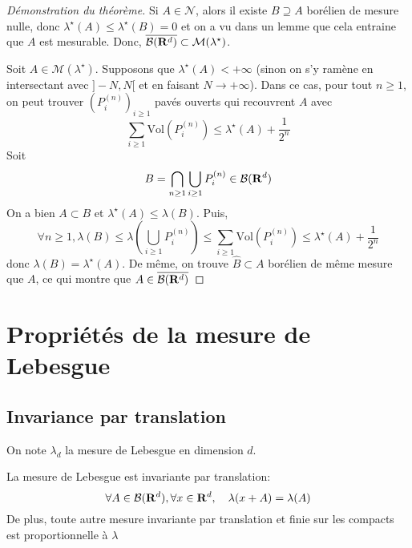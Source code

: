 \begin{proof}[Démonstration du théorème]
    Si $A \in  \mathcal N$, alors il existe $B\supseteq A$ borélien de mesure nulle, donc  $\lambda^\star(A)\leq \lambda^\star (B)=0$ et on a vu dans un lemme que cela entraine que $A$ est mesurable. Donc,  $\overline{\mathcal  B(\mathbf R^d)}\subset \mathcal  M(\lambda^\star)$.

    Soit $A \in  \mathcal  M(\lambda^\star)$. Supposons que $\lambda^\star(A)<+\infty$ (sinon on s'y ramène en intersectant avec $]-N,N[$ et en faisant  $N\to +\infty$). Dans ce cas, pour tout $n\geq 1$, on peut trouver $(P_i^{(n)})_{i\geq 1}$ pavés ouverts qui recouvrent  $A$ avec  \[
        \sum_{i\geq 1}\mathrm{Vol}(P_i^{(n)})\leq \lambda^\star(A)+ \frac1{2^n}
    \] 
    Soit  \[
        B=\bigcap_{n\geq 1}\bigcup _{i\geq 1}P_i^{(n)} \in  \mathcal  B(\mathbf R^d)
    \] 
    On a bien $A\subset B$ et  $\lambda^\star(A)\leq \lambda(B)$. Puis, \[
        \forall  n\geq 1, \lambda(B) \leq  \lambda \left( \bigcup_{i\geq 1} P_i^{(n)} \right)\leq \sum_{i\geq 1} \mathrm{Vol}(P_i^{(n)})\leq \lambda^\star(A)+\frac1{2^n}
    \] 
    donc $\lambda(B)=\lambda^\star(A)$. De même, on trouve  $\hat{B} \subset A$ borélien de même mesure que $A$, ce qui montre que  $A \in  \overline{\mathcal  B(\mathbf R^d)}$
\end{proof}

\section{Propriétés de la mesure de Lebesgue}

\subsection{Invariance par translation}

On note $\lambda_d$ la mesure de Lebesgue en dimension  $d$.

 \begin{thm}
La mesure de Lebesgue est invariante par translation: \[
    \forall  A \in  \mathcal  B(\mathbf R^d), \forall x \in  \mathbf R^d, \quad  \lambda(x+A)=\lambda(A)
\]
De plus, toute autre mesure invariante par translation et finie sur les compacts est proportionnelle à $\lambda$
\end{thm}

